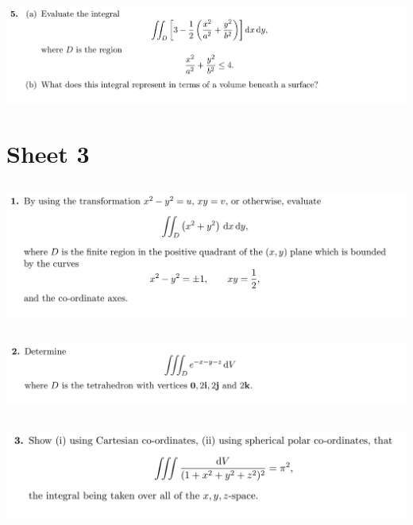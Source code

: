 \documentclass[12pt]{article}
\begin{document}
\subsection{}
\begin{mdframed}
\includegraphics[width=400pt]{img/oxford-prelims-M5-multivariable-calc-2-5.png}
\end{mdframed}



\newpage
\section{Sheet 3}


\subsection{}
\begin{mdframed}
  \includegraphics[width=400pt]{img/oxford-prelims-M5-multivariable-calc-3-1.png}
\end{mdframed}

\subsection{}
\begin{mdframed}
  \includegraphics[width=400pt]{img/oxford-prelims-M5-multivariable-calc-3-2.png}
\end{mdframed}

\subsection{}
\begin{mdframed}
  \includegraphics[width=400pt]{img/oxford-prelims-M5-multivariable-calc-3-3.png}
\end{mdframed}
\end{document}
